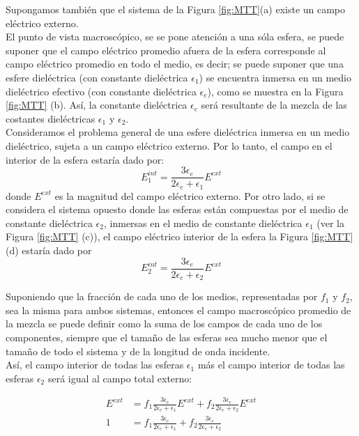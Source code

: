 \documentclass[a4paper,11pt,]{book}
\begin{document}
Supongamos también que el sistema de la Figura \ref{fig:MTT}(a) existe un campo eléctrico externo. \\
El punto de vista macroscópico, se se pone atención a una sóla esfera, se puede suponer que el campo eléctrico promedio afuera de la esfera corresponde al campo eléctrico promedio en todo el medio, es decir; se puede suponer que una esfere dieléctrica (con constante dieléctrica $\epsilon_1$) se encuentra inmersa en un medio dieléctrico efectivo (con constante dieléctrica $\epsilon_e$), como se muestra en la Figura \ref{fig:MTT} (b). Así, la constante dieléctrica $\epsilon_e$ será resultante de la mezcla de las costantes dieléctricas $\epsilon_1$ y $\epsilon_2$.\\
Consideramos el problema general de una esfere dieléctrica inmersa en un medio dieléctrico, sujeta a un campo eléctrico externo. Por lo tanto, el campo en el interior de la esfera estaría dado por:
\begin{equation}
E^{int}_1= \frac{3\epsilon_e}{2\epsilon_e + \epsilon_1} E^{ext}
\end{equation}
donde $E^{ext}$ es la magnitud del campo eléctrico externo. Por otro lado, si se considera el sistema opuesto donde las esferas están compuestas por el medio de constante dieléctrica $\epsilon_2$, inmersas en el medio de constante dieléctrica $\epsilon_1$ (ver la Figura \ref{fig:MTT} (c)), el campo eléctrico interior de la esfera la Figura \ref{fig:MTT} (d) estaría dado por
\begin{equation}
E^{int}_2=\frac{3\epsilon_e}{2\epsilon_e+\epsilon_2} E^{ext}
\end{equation}

Suponiendo que la fracción de cada uno de los medios, representadas por $f_1$ y $f_2$, sea la misma para ambos sistemas, entonces el campo macroscópico promedio de la mezcla se puede definir como la suma de los campos de cada uno de los componentes, siempre que el tamaño de las esferas sea mucho menor que el tamaño de todo el sistema y de la longitud de onda incidente.\\
Así, el campo interior de todas las esferas $\epsilon_1$ más el campo interior de todas las esferas $\epsilon_2$ será igual al campo total externo:

\begin{equation}
\begin{split}
E^{ext} &= f_1 \frac{3 \epsilon_e}{2\epsilon_e + \epsilon_1} E^{ext}+ f_2 \frac{3 \epsilon_e}{2\epsilon_e + \epsilon_2} E^{ext}\\
1 &= f_1 \frac{3\epsilon_e}{2\epsilon_e+\epsilon_1}+ f_2 \frac{3\epsilon_e}{2\epsilon_e+\epsilon_2}
\end{split}
\end{equation}
\end{document}
